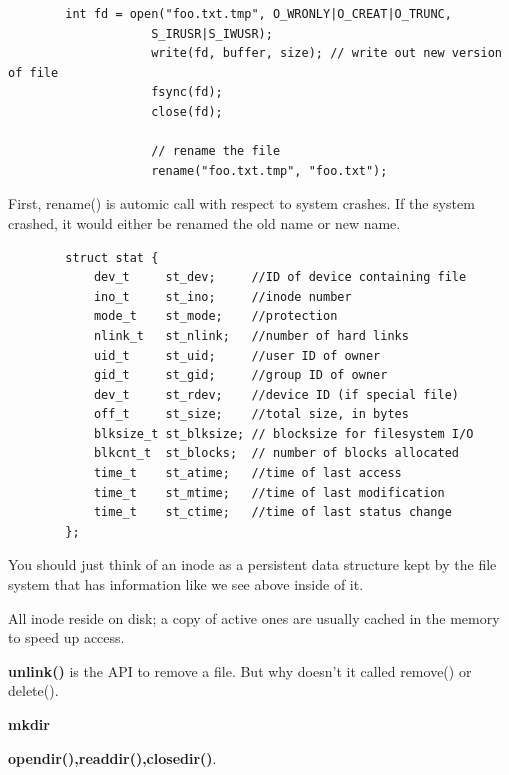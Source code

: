 
    \begin{lstlisting}
        int fd = open("foo.txt.tmp", O_WRONLY|O_CREAT|O_TRUNC,
                    S_IRUSR|S_IWUSR);
                    write(fd, buffer, size); // write out new version of file
                    fsync(fd);
                    close(fd);

                    // rename the file
                    rename("foo.txt.tmp", "foo.txt");
    \end{lstlisting}

    First, rename() is automic call with respect to system crashes. If the system crashed,
    it would either be renamed the old name or new name.


    \begin{lstlisting}
        struct stat {
            dev_t     st_dev;     //ID of device containing file
            ino_t     st_ino;     //inode number
            mode_t    st_mode;    //protection
            nlink_t   st_nlink;   //number of hard links 
            uid_t     st_uid;     //user ID of owner
            gid_t     st_gid;     //group ID of owner
            dev_t     st_rdev;    //device ID (if special file)
            off_t     st_size;    //total size, in bytes
            blksize_t st_blksize; // blocksize for filesystem I/O
            blkcnt_t  st_blocks;  // number of blocks allocated
            time_t    st_atime;   //time of last access
            time_t    st_mtime;   //time of last modification
            time_t    st_ctime;   //time of last status change 
        };
    \end{lstlisting}

    You should just think of an inode as a persistent data structure kept by the file system 
    that has information like we see above inside of it. 

    All inode reside on disk; a copy of active ones are usually cached in the memory to 
    speed up access.


        \textbf{unlink()} is the API to remove a file. But why doesn't it called remove() or delete().
        
        \textbf{mkdir}


        \textbf{opendir(),readdir(),closedir()}.

